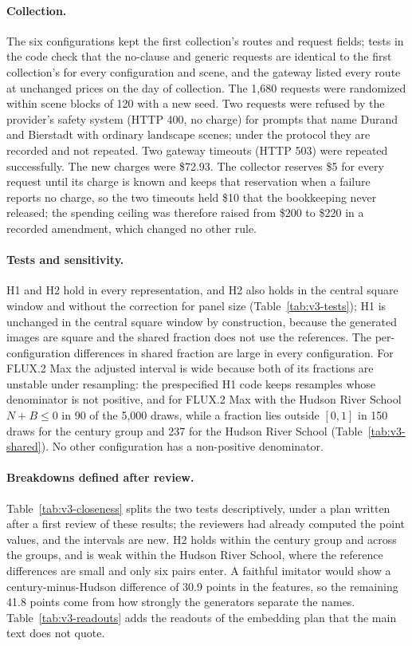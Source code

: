 

\paragraph{Collection.} The six configurations kept the first collection's routes and request
fields; tests in the code check that the no-clause and generic requests are identical to the first
collection's for every configuration and scene, and the gateway listed every route at unchanged
prices on the day of collection. The 1,680 requests were randomized within scene blocks of 120
with a new seed. Two requests were refused by the provider's safety system (HTTP 400, no charge)
for prompts that name Durand and Bierstadt with ordinary landscape scenes; under the protocol they
are recorded and not repeated. Two gateway timeouts (HTTP 503) were repeated successfully. The new
charges were \$72.93. The collector reserves \$5 for every request until its charge is known and
keeps that reservation when a failure reports no charge, so the two timeouts held \$10 that the
bookkeeping never released; the spending ceiling was therefore raised from \$200 to \$220 in a
recorded amendment, which changed no other rule.



\paragraph{Tests and sensitivity.} H1 and H2 hold in every representation, and H2 also holds in the
central square window and without the correction for panel size (Table~\ref{tab:v3-tests}); H1 is
unchanged in the central square window by construction, because the generated images are square
and the shared fraction does not use the references. The per-configuration differences in shared
fraction are large in every configuration. For FLUX.2 Max the adjusted interval is wide because
both of its fractions are unstable under resampling: the prespecified H1 code keeps resamples whose
denominator is not positive, and for FLUX.2 Max with the Hudson River School $N+B\le0$ in 90 of the
5,000 draws, while a fraction lies outside $[0,1]$ in 150 draws for the century group and 237 for
the Hudson River School (Table~\ref{tab:v3-shared}). No other configuration has a non-positive
denominator.

\paragraph{Breakdowns defined after review.} Table~\ref{tab:v3-closeness} splits the two tests
descriptively, under a plan written after a first review of these results; the reviewers had
already computed the point values, and the intervals are new. H2 holds within the century group and
across the groups, and is weak within the Hudson River School, where the reference differences are
small and only six pairs enter. A faithful imitator would show a century-minus-Hudson difference of
30.9 points in the features, so the remaining 41.8 points come from how strongly the generators
separate the names. Table~\ref{tab:v3-readouts} adds the readouts of the embedding plan that the
main text does not quote.

